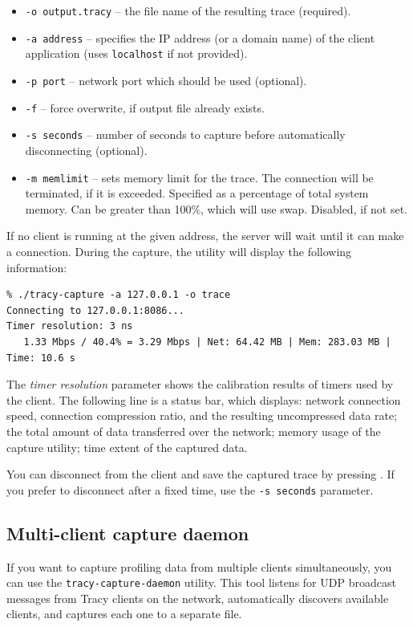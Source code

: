 \documentclass[hidelinks,titlepage,a4paper,twoside]{article}
\begin{document}
\begin{itemize}
\item \texttt{-o output.tracy} -- the file name of the resulting trace (required).
\item \texttt{-a address} -- specifies the IP address (or a domain name) of the client application (uses \texttt{localhost} if not provided).
\item \texttt{-p port} -- network port which should be used (optional).
\item \texttt{-f} -- force overwrite, if output file already exists.
\item \texttt{-s seconds} -- number of seconds to capture before automatically disconnecting (optional).
\item \texttt{-m memlimit} -- sets memory limit for the trace. The connection will be terminated, if it is exceeded. Specified as a percentage of total system memory. Can be greater than 100\%, which will use swap. Disabled, if not set.
\end{itemize}

If no client is running at the given address, the server will wait until it can make a connection. During the capture, the utility will display the following information:

\begin{verbatim}
% ./tracy-capture -a 127.0.0.1 -o trace
Connecting to 127.0.0.1:8086...
Timer resolution: 3 ns
   1.33 Mbps / 40.4% = 3.29 Mbps | Net: 64.42 MB | Mem: 283.03 MB | Time: 10.6 s
\end{verbatim}

The \emph{timer resolution} parameter shows the calibration results of timers used by the client. The following line is a status bar, which displays: network connection speed, connection compression ratio, and the resulting uncompressed data rate; the total amount of data transferred over the network; memory usage of the capture utility; time extent of the captured data.

You can disconnect from the client and save the captured trace by pressing . If you prefer to disconnect after a fixed time, use the \texttt{-s seconds} parameter.

\subsection{Multi-client capture daemon}

If you want to capture profiling data from multiple clients simultaneously, you can use the \texttt{tracy-capture-daemon} utility. This tool listens for UDP broadcast messages from Tracy clients on the network, automatically discovers available clients, and captures each one to a separate file.
\end{document}
